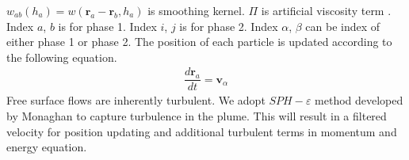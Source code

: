 \documentclass[conference,compsoc]{IEEEtran}
\begin{document}
$w_{ab} (h_a)= w(\textbf{r}_a-\textbf{r}_b,h_a)$ is smoothing kernel.
$\Pi$ is artificial viscosity term \cite{monaghan1992smoothed}.
Index $a$, $b$ is for phase 1.
Index $i$, $j$ is for phase 2.
Index $\alpha$, $\beta$ can be index of either phase 1 or phase 2.
The position of each particle is updated according to the following equation.
\begin{align}
\dfrac{d \textbf{r}_a}{dt} = \textbf{v}_{\alpha} \label{eq:gov-update-pos}
\end{align}
Free surface flows are inherently turbulent. We adopt $SPH-\varepsilon$ method developed by Monaghan\cite{monaghan2011turbulence} to capture turbulence in the plume. This will result in a filtered velocity for position updating and additional turbulent terms in momentum and energy equation.
\end{document}
